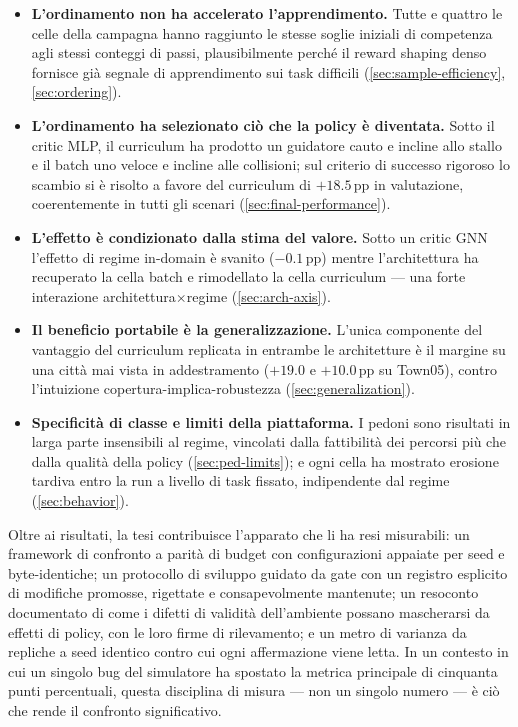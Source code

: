 \begin{itemize}
  \item \textbf{L'ordinamento non ha accelerato l'apprendimento.} Tutte
        e quattro le celle della campagna hanno raggiunto le stesse
        soglie iniziali di competenza agli stessi conteggi di passi,
        plausibilmente perché il reward shaping denso fornisce già
        segnale di apprendimento sui task difficili
        (\cref{sec:sample-efficiency}, \cref{sec:ordering}).
  \item \textbf{L'ordinamento ha selezionato ciò che la policy è
        diventata.} Sotto il critic MLP, il curriculum ha prodotto un
        guidatore cauto e incline allo stallo e il batch uno veloce e
        incline alle collisioni; sul criterio di successo rigoroso lo
        scambio si è risolto a favore del curriculum di $+18.5$\,pp in
        valutazione, coerentemente in tutti gli scenari
        (\cref{sec:final-performance}).
  \item \textbf{L'effetto è condizionato dalla stima del valore.} Sotto
        un critic GNN l'effetto di regime in-domain è svanito
        ($-0.1$\,pp) mentre l'architettura ha recuperato la cella batch
        e rimodellato la cella curriculum --- una forte interazione
        architettura$\times$regime (\cref{sec:arch-axis}).
  \item \textbf{Il beneficio portabile è la generalizzazione.} L'unica
        componente del vantaggio del curriculum replicata in entrambe
        le architetture è il margine su una città mai vista in
        addestramento ($+19.0$ e $+10.0$\,pp su Town05), contro
        l'intuizione copertura-implica-robustezza
        (\cref{sec:generalization}).
  \item \textbf{Specificità di classe e limiti della piattaforma.} I
        pedoni sono risultati in larga parte insensibili al regime,
        vincolati dalla fattibilità dei percorsi più che dalla qualità
        della policy (\cref{sec:ped-limits}); e ogni cella ha mostrato
        erosione tardiva entro la run a livello di task fissato,
        indipendente dal regime (\cref{sec:behavior}).
\end{itemize}

Oltre ai risultati, la tesi contribuisce l'apparato che li ha resi
misurabili: un framework di confronto a parità di budget con
configurazioni appaiate per seed e byte-identiche; un protocollo di
sviluppo guidato da gate con un registro esplicito di modifiche
promosse, rigettate e consapevolmente mantenute; un resoconto
documentato di come i difetti di validità dell'ambiente possano
mascherarsi da effetti di policy, con le loro firme di rilevamento; e
un metro di varianza da repliche a seed identico contro cui ogni
affermazione viene letta. In un contesto in cui un singolo bug del
simulatore ha spostato la metrica principale di cinquanta punti
percentuali, questa disciplina di misura --- non un singolo numero ---
è ciò che rende il confronto significativo.

